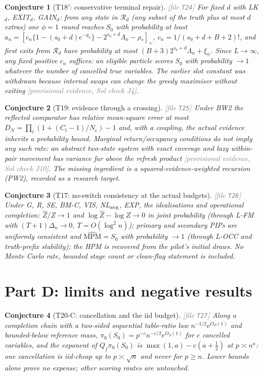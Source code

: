 \documentclass[11pt,a4paper]{article}
\theoremstyle{plain}
\newtheorem{conjecture}{Conjecture}[section]
\theoremstyle{definition}
\theoremstyle{remark}
\newcommand{\calR}{\mathcal{R}}
\newcommand{\Sz}{S_0}
\newcommand{\sz}{s_0}
\newcommand{\MPM}{\mathrm{MPM}}
\newcommand{\Zhat}{\widehat Z}
\newcommand{\pizero}{\pi_0}
\newcommand{\Ne}{N_{e}}
\newcommand{\Qf}{Q_{f}}
\newcommand{\provisional}[1]{\textcolor{gray}{[provisional evidence, Sol check #1]}}
\newcommand{\thfile}[1]{\textcolor{gray}{\footnotesize[file \texttt{#1}]}}
\begin{document}
\begin{conjecture}[T18$'$: conservative terminal repair]\thfile{T24}
For fixed $d$ with LK$_d$, EXIT$_d$, GAIN$_d$: from any state in $\calR_d$ (any subset of the truth plus at most $d$ extras) one $\phi=1$ round reaches $\Sz$ with probability at least $a_n=[c_n\{1-(\sz+d)e^{-g_n}\}-2^{\sz+d}\Lambda_n-\rho_*]_+$, $c_n=1/(\sz+d+B+2)!$, and first exits from $\calR_d$ have probability at most $(B+3)2^{\sz+d}\Lambda_n+\xi_n$. Since $L\to\infty$, any fixed positive $c_n$ suffices: an eligible particle scores $\Sz$ with probability $\to1$ whatever the number of cancelled true variables. The earlier slot constant was withdrawn because internal swaps can change the greedy maximiser without exiting \provisional{J4}.
\end{conjecture}

\begin{conjecture}[T19: evidence through a crossing]\thfile{T25}
Under BW2 the reflected comparator has relative mean-square error at most $D_N=\prod_t(1+(C_t-1)/\Ne)-1$ and, with a coupling, the actual evidence inherits a probability bound. Marginal return/occupancy conditions do \emph{not} imply any such rate: an abstract two-state system with exact coverage and lazy within-pair movement has variance far above the refresh product \provisional{J10}. The missing ingredient is a squared-evidence-weighted recursion (PW2), recorded as a research target.
\end{conjecture}

\begin{conjecture}[T17: no-switch consistency at the actual budgets]\thfile{T26}
Under G, R, SE, BM-C, VIS, NL$_{\rm avg}$, EXP, the idealisations and operational completion: $\Zhat/Z\to1$ and $\log\Zhat-\log Z\to0$ in joint probability (through L-FM with $(T+1)\Delta_n\to0$, $T=O(\log^2n)$); primary and secondary PIPs are uniformly consistent and $\widehat{\MPM}=\Sz$ with probability $\to1$ (through L-OCC and truth-prefix stability); the HPM is recovered from the pilot's initial draws. No Monte Carlo rate, bounded stage count or clean-flag statement is included.
\end{conjecture}

\section{Part D: limits and negative results}

\begin{conjecture}[T20-C: cancellation and the iid budget]\thfile{T27}
Along a completion chain with a two-sided sequential table-ratio law $n^{-1/2}e^{O_P(1)}$ and bounded-below reference mass, $\pizero(\Sz)=p^{-c}n^{-c/2}e^{O_P(1)}$ for $c$ cancelled variables, and the exponent of $\Qf\pizero(\Sz)$ is $\max(1,a)-c(a+\tfrac12)$ at $p\asymp n^a$: one cancellation is iid-cheap up to $p\asymp\sqrt n$ and never for $p\ge n$. Lower bounds alone prove no expense; other scoring routes are untouched.
\end{conjecture}
\end{document}
